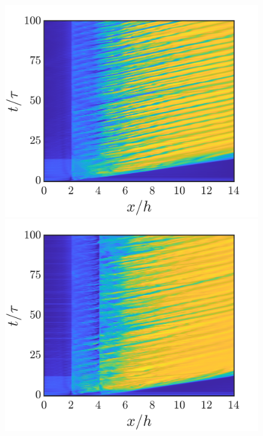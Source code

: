 \documentclass[reprint,a4paper,fleqn]{cas-dc} %
\begin{document}
\begin{figure}[t]
			\begin{minipage}[c]{0.24\linewidth}
				\includegraphics[width=1\linewidth,trim={1.6cm 2cm 2cm 1cm},clip]{Figures/MI_HL/spcaeTime_M_Singled.png}
				\includegraphics[width=1\linewidth,trim={1.6cm 2cm 2cm 1cm},clip]{Figures/MI_HL/spcaeTime_M_4d.png}

\end{minipage}
\end{figure}
\end{document}
